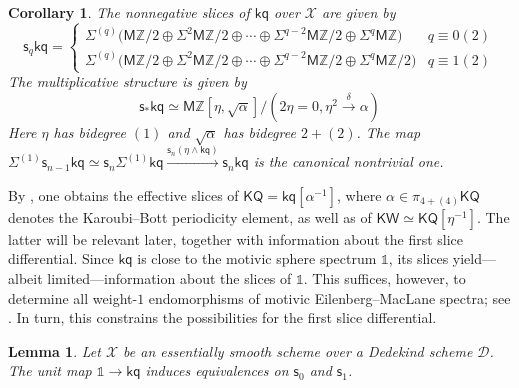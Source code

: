 \documentclass[11pt,hyp,english]{article}
\newcommand{\Z}{\mathbb{Z}}
\newcommand{\unit}{\mathds{1}}
\newcommand{\KQ}{\mathsf{KQ}}
\newcommand{\KW}{\mathsf{KW}}
\newcommand{\kq}{\mathsf{kq}}
\newcommand{\MZ}{\mathsf{M}\Z}
\newcommand{\s}{\mathsf{s}}
\let\smash=\wedge
\newtheorem{lemma}[theorem]{Lemma}
\newtheorem{corollary}[theorem]{Corollary}
\theoremstyle{definition}
\begin{document}
\begin{corollary}\label{cor:slices-kq}
The nonnegative slices of $\kq$ over $\mathcal{X}$ are given by 
\[ \s_q\kq=
\begin{cases} 
\Sigma^{(q)} \bigl(\MZ/2\oplus  \Sigma^2\MZ/2 \oplus  \dotsm \oplus  \Sigma^{q-2} \MZ/2 \oplus  \Sigma^q \MZ\bigr) & q\equiv 0(2) \\
\Sigma^{(q)} \bigl(\MZ/2\oplus  \Sigma^2\MZ/2 \oplus  \dotsm \oplus  \Sigma^{q-2} \MZ/2 \oplus  \Sigma^q \MZ/2\bigr) & q\equiv 1(2)
\end{cases}
\]
The multiplicative structure is given by  
\[ \s_\ast \kq \simeq \MZ[\eta,\sqrt{\alpha}]/(2\eta=0, \eta^2\xrightarrow{\delta} \alpha) \]
Here $\eta$ has bidegree $(1)$ and $\sqrt{\alpha}$ has bidegree $2+(2)$.
The map $\Sigma^{(1)}\s_{n-1}\kq\simeq \s_{n}\Sigma^{(1)} \kq \xrightarrow{\s_{n}(\eta\smash \kq)}\s_n\kq$ is the canonical nontrivial one.
\end{corollary}

By , one obtains the effective slices of $\KQ=\kq[\alpha^{-1}]$, where $\alpha\in \pi_{4+(4)}\KQ$ denotes the Karoubi–Bott periodicity element, as well as of $\KW\simeq \KQ[\eta^{-1}]$. The latter will be relevant later, together with information about the first slice differential. Since $\kq$ is close to the motivic sphere spectrum $\unit$, its slices yield—albeit limited—information about the slices of $\unit$. This suffices, however, to determine all weight-$1$ endomorphisms of motivic Eilenberg–MacLane spectra; see . In turn, this constrains the possibilities for the first slice differential.


\begin{lemma}\label{lem:unit-kq-slices}
Let $\mathcal{X}$ be an essentially smooth scheme over a Dedekind scheme $\mathcal{D}$.
The unit map $\unit\to \kq$ induces equivalences on $\s_0$ and $\s_1$.
\end{lemma}
\end{document}

